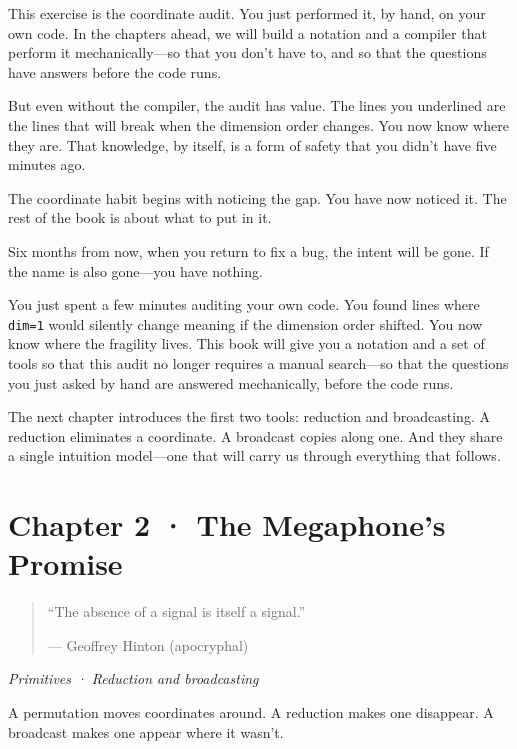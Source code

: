 \documentclass[11pt,titlepage]{article}
\begin{document}
This exercise is the coordinate audit. You just performed it, by hand,
on your own code. In the chapters ahead, we will build a notation and a
compiler that perform it mechanically---so that you don't have to, and
so that the questions have answers before the code runs.

But even without the compiler, the audit has value. The lines you
underlined are the lines that will break when the dimension order
changes. You now know where they are. That knowledge, by itself, is a
form of safety that you didn't have five minutes ago.

The coordinate habit begins with noticing the gap. You have now noticed
it. The rest of the book is about what to put in it.

Six months from now, when you return to fix a bug, the intent will be
gone. If the name is also gone---you have nothing.

\vspace{2em}

You just spent a few minutes auditing your own code. You found lines
where \texttt{dim=1} would silently change meaning if the dimension
order shifted. You now know where the fragility lives. This book will
give you a notation and a set of tools so that this audit no longer
requires a manual search---so that the questions you just asked by hand
are answered mechanically, before the code runs.

The next chapter introduces the first two tools: reduction and
broadcasting. A reduction eliminates a coordinate. A broadcast copies
along one. And they share a single intuition model---one that will carry
us through everything that follows.

\newpage

\hypertarget{chapter-2-the-megaphones-promise}{%
\section{Chapter 2 · The Megaphone's
Promise}\label{chapter-2-the-megaphones-promise}}

\begin{quote}
``The absence of a signal is itself a signal.''

--- Geoffrey Hinton (apocryphal)
\end{quote}

\emph{Primitives · Reduction and broadcasting}

\vspace{2em}

A permutation moves coordinates around. A reduction makes one disappear.
A broadcast makes one appear where it wasn't.
\end{document}
